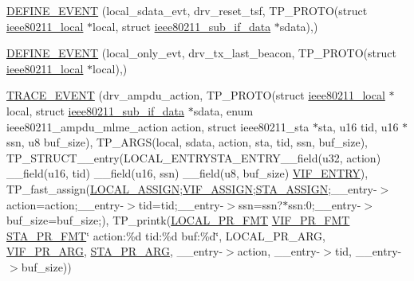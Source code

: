 \begin{DoxyCompactItemize}
\item 
\hyperlink{driver-trace_8h_a0f45fa7be481c86c711b8d91eeb1a297}{D\-E\-F\-I\-N\-E\-\_\-\-E\-V\-E\-N\-T} (local\-\_\-sdata\-\_\-evt, drv\-\_\-reset\-\_\-tsf, T\-P\-\_\-\-P\-R\-O\-T\-O(struct \hyperlink{structieee80211__local}{ieee80211\-\_\-local} $\ast$local, struct \hyperlink{structieee80211__sub__if__data}{ieee80211\-\_\-sub\-\_\-if\-\_\-data} $\ast$sdata),)
\item 
\hyperlink{driver-trace_8h_afeb41ae576d7d149146afb31c7c82e5c}{D\-E\-F\-I\-N\-E\-\_\-\-E\-V\-E\-N\-T} (local\-\_\-only\-\_\-evt, drv\-\_\-tx\-\_\-last\-\_\-beacon, T\-P\-\_\-\-P\-R\-O\-T\-O(struct \hyperlink{structieee80211__local}{ieee80211\-\_\-local} $\ast$local),)
\item 
\hyperlink{driver-trace_8h_a1a8593b0845b954a713eb9c08f067904}{T\-R\-A\-C\-E\-\_\-\-E\-V\-E\-N\-T} (drv\-\_\-ampdu\-\_\-action, T\-P\-\_\-\-P\-R\-O\-T\-O(struct \hyperlink{structieee80211__local}{ieee80211\-\_\-local} $\ast$local, struct \hyperlink{structieee80211__sub__if__data}{ieee80211\-\_\-sub\-\_\-if\-\_\-data} $\ast$sdata, enum ieee80211\-\_\-ampdu\-\_\-mlme\-\_\-action action, struct ieee80211\-\_\-sta $\ast$sta, u16 tid, u16 $\ast$ssn, u8 buf\-\_\-size), T\-P\-\_\-\-A\-R\-G\-S(local, sdata, action, sta, tid, ssn, buf\-\_\-size), T\-P\-\_\-\-S\-T\-R\-U\-C\-T\-\_\-\-\_\-entry(L\-O\-C\-A\-L\-\_\-\-E\-N\-T\-R\-Y\-S\-T\-A\-\_\-\-E\-N\-T\-R\-Y\-\_\-\-\_\-field(u32, action) \-\_\-\-\_\-field(u16, tid) \-\_\-\-\_\-field(u16, ssn) \-\_\-\-\_\-field(u8, buf\-\_\-size) \hyperlink{driver-trace_8h_af9528f0b6f59f04b6c6ab283b1b65d9d}{V\-I\-F\-\_\-\-E\-N\-T\-R\-Y}), T\-P\-\_\-fast\-\_\-assign(\hyperlink{driver-trace_8h_ab19d9141887ea92ef9640df06a51e0a1}{L\-O\-C\-A\-L\-\_\-\-A\-S\-S\-I\-G\-N};\hyperlink{driver-trace_8h_af5ede80f04ffcb3f644f68837b1d252c}{V\-I\-F\-\_\-\-A\-S\-S\-I\-G\-N};\hyperlink{driver-trace_8h_abbd837b5fc444c0cb48b5954f8ad068a}{S\-T\-A\-\_\-\-A\-S\-S\-I\-G\-N};\-\_\-\-\_\-entry-\/$>$action=action;\-\_\-\-\_\-entry-\/$>$tid=tid;\-\_\-\-\_\-entry-\/$>$ssn=ssn?$\ast$ssn\-:0;\-\_\-\-\_\-entry-\/$>$buf\-\_\-size=buf\-\_\-size;), T\-P\-\_\-printk(\hyperlink{driver-trace_8h_a09833af423135e21ffe99a59ae088cf1}{L\-O\-C\-A\-L\-\_\-\-P\-R\-\_\-\-F\-M\-T} \hyperlink{driver-trace_8h_a50711161ccfc99a73b43b988149a61a5}{V\-I\-F\-\_\-\-P\-R\-\_\-\-F\-M\-T} \hyperlink{driver-trace_8h_a73d0cd445b999888e3f21698b769c843}{S\-T\-A\-\_\-\-P\-R\-\_\-\-F\-M\-T}\char`\"{} action\-:\%d tid\-:\%d buf\-:\%d\char`\"{}, L\-O\-C\-A\-L\-\_\-\-P\-R\-\_\-\-A\-R\-G, \hyperlink{driver-trace_8h_a12c9f3afcd1c461f7ae2f86fd8503977}{V\-I\-F\-\_\-\-P\-R\-\_\-\-A\-R\-G}, \hyperlink{driver-trace_8h_a3b71cc34bae124028f19970a4220d4ab}{S\-T\-A\-\_\-\-P\-R\-\_\-\-A\-R\-G}, \-\_\-\-\_\-entry-\/$>$action, \-\_\-\-\_\-entry-\/$>$tid, \-\_\-\-\_\-entry-\/$>$buf\-\_\-size))

\end{DoxyCompactItemize}

